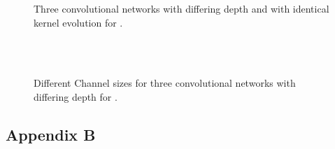\begin{figure}[!htp]
	
\end{figure}
\begin{figure}
	\scalebox{.9}{}
	\scalebox{.9}{}
	\scalebox{.9}{}
	\caption{Three convolutional networks with differing depth and with identical kernel evolution for \rare.}
\end{figure}
\begin{figure}
	\scalebox{1}{}\\
	\scalebox{1}{}\\
	\scalebox{1}{}
	\caption{Different Channel sizes for three convolutional networks with differing depth for \rare.}
\end{figure}
\subsection{Appendix B}\label{Sec:AppendixA}
